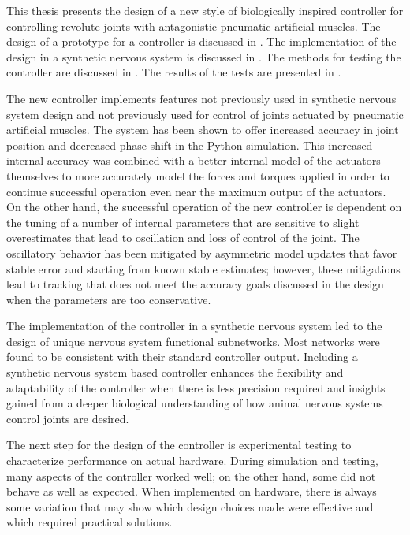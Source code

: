 
This thesis presents the design of a new style of biologically inspired
controller for controlling revolute joints with antagonistic pneumatic
artificial muscles. The
design of a prototype for a controller is discussed in
. The implementation of the design in a
synthetic nervous system is discussed in . The methods
for testing the controller are discussed in . The results of
the tests are presented in .

The new controller implements features not previously used in synthetic nervous
system design and not previously used for control of joints actuated by
pneumatic artificial muscles. The system has been shown to offer
increased accuracy in joint position and decreased phase shift in the Python simulation. This increased internal accuracy was
combined with a better internal model of the actuators themselves to more
accurately model the forces and torques applied in order to continue successful
operation even near the maximum output of the actuators. On the other hand, the
successful operation of the new controller is dependent on the tuning of a number of
internal parameters that are sensitive to slight overestimates that lead to
oscillation and loss of control of the joint. The oscillatory behavior has been mitigated by
asymmetric model updates that favor stable error and starting from known stable
estimates; however, these mitigations lead to tracking that does not meet the accuracy goals
discussed in the design when the parameters are too conservative.

The implementation of the controller in a synthetic nervous system led to the
design of unique nervous system functional subnetworks. Most networks
were found to be consistent with their standard controller output.
Including a synthetic nervous system based controller enhances the flexibility and adaptability of the controller when there is less precision required and insights gained from a deeper biological understanding of how animal nervous systems control joints are desired.


The next step for the design of the controller is experimental testing to
characterize performance on actual hardware. During simulation and testing,
many aspects of the controller worked well; on the other hand, some did not
behave as well as expected. When implemented on hardware, there is always some variation that may
show which design choices made were effective and which required practical solutions.

